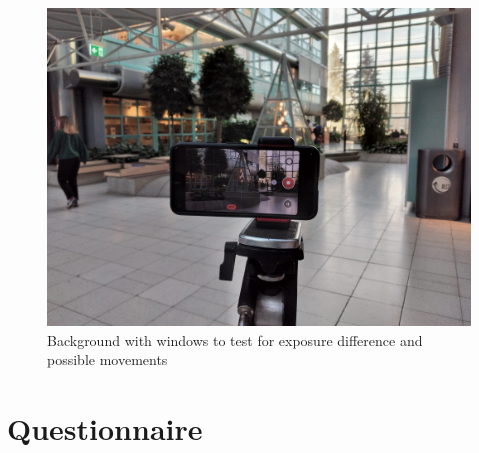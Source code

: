 \begin{figure}[H]
    \centering
    \includegraphics[width=\textwidth]{img/background_setup/windows.jpg}
    \caption{Background  with  windows  to  test for exposure difference and possible movements}
    \label{fig:windows_setup}
\end{figure}


\chapter{Questionnaire}\label{cha:appendix-questionnaire}

